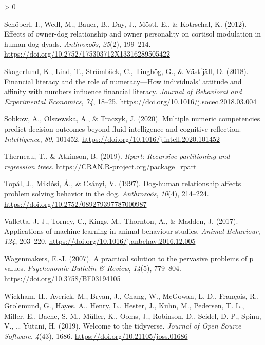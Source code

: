 \documentclass[
  english,
  ,pub,floatsintext]{apa6}
\newlength{\cslhangindent}
\newenvironment{CSLReferences}[2] %
 {%
  \setlength{\parindent}{0pt}
  \ifodd #1 \everypar{\setlength{\hangindent}{\cslhangindent}}\ignorespaces\fi
  \ifnum #2 > 0
  \setlength{\parskip}{#2\baselineskip}
  \fi
 }%
 {}
\begin{document}
\begin{CSLReferences}{1}{0}
\leavevmode\hypertarget{ref-Schoberl.etal.2012}{}%
Schöberl, I., Wedl, M., Bauer, B., Day, J., Möstl, E., \& Kotrschal, K. (2012). Effects of owner-dog relationship and owner personality on cortisol modulation in human-dog dyads. \emph{Anthrozoös}, \emph{25}(2), 199--214. \url{https://doi.org/10.2752/175303712X13316289505422}

\leavevmode\hypertarget{ref-Skagerlund.etal.2018}{}%
Skagerlund, K., Lind, T., Strömbäck, C., Tinghög, G., \& Västfjäll, D. (2018). Financial literacy and the role of numeracy---{How} individuals' attitude and affinity with numbers influence financial literacy. \emph{Journal of Behavioral and Experimental Economics}, \emph{74}, 18--25. \url{https://doi.org/10.1016/j.socec.2018.03.004}

\leavevmode\hypertarget{ref-Sobkow.etal.2020}{}%
Sobkow, A., Olszewska, A., \& Traczyk, J. (2020). Multiple numeric competencies predict decision outcomes beyond fluid intelligence and cognitive reflection. \emph{Intelligence}, \emph{80}, 101452. \url{https://doi.org/10.1016/j.intell.2020.101452}

\leavevmode\hypertarget{ref-R-rpart}{}%
Therneau, T., \& Atkinson, B. (2019). \emph{Rpart: Recursive partitioning and regression trees}. \url{https://CRAN.R-project.org/package=rpart}

\leavevmode\hypertarget{ref-Topal.etal.1997}{}%
Topál, J., Miklósi, Á., \& Csányi, V. (1997). Dog-human relationship affects problem solving behavior in the dog. \emph{Anthrozoös}, \emph{10}(4), 214--224. \url{https://doi.org/10.2752/089279397787000987}

\leavevmode\hypertarget{ref-Valletta.etal.2017}{}%
Valletta, J. J., Torney, C., Kings, M., Thornton, A., \& Madden, J. (2017). Applications of machine learning in animal behaviour studies. \emph{Animal Behaviour}, \emph{124}, 203--220. \url{https://doi.org/10.1016/j.anbehav.2016.12.005}

\leavevmode\hypertarget{ref-Wagenmakers.2007}{}%
Wagenmakers, E.-J. (2007). A practical solution to the pervasive problems of p values. \emph{Psychonomic Bulletin \& Review}, \emph{14}(5), 779--804. \url{https://doi.org/10.3758/BF03194105}

\leavevmode\hypertarget{ref-R-tidyverse}{}%
Wickham, H., Averick, M., Bryan, J., Chang, W., McGowan, L. D., François, R., Grolemund, G., Hayes, A., Henry, L., Hester, J., Kuhn, M., Pedersen, T. L., Miller, E., Bache, S. M., Müller, K., Ooms, J., Robinson, D., Seidel, D. P., Spinu, V., \ldots{} Yutani, H. (2019). Welcome to the {tidyverse}. \emph{Journal of Open Source Software}, \emph{4}(43), 1686. \url{https://doi.org/10.21105/joss.01686}


\end{CSLReferences}
\end{document}
